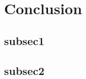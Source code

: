 \section{Conclusion}\label{sec_conclusion}


\subsection{subsec1}


\subsection{subsec2}\label{conclusion_subsec2}


